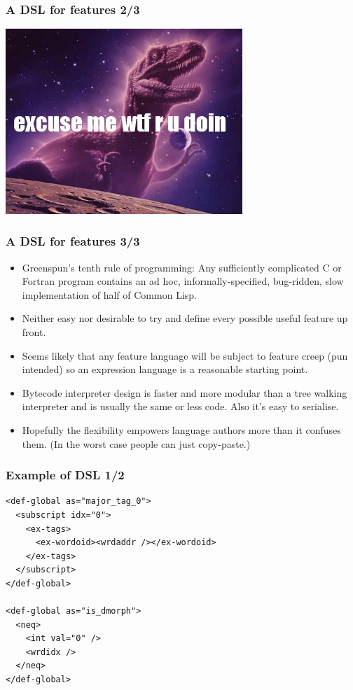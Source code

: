 \documentclass{beamer}
\begin{document}
\begin{frame}
\frametitle{A DSL for features 2/3}
\begin{center}
  \includegraphics[height=7cm]{excuse-me-wtf-are-you-doing.jpg}
\end{center}
\end{frame}

\begin{frame}
\frametitle{A DSL for features 3/3}
\begin{itemize}

  \item Greenspun's tenth rule of programming: Any sufficiently complicated C
    or Fortran program contains an ad hoc, informally-specified, bug-ridden,
    slow implementation of half of Common Lisp.

  \item Neither easy nor desirable to try and define every possible useful
    feature up front.

  \item Seems likely that any feature language will be subject to feature creep
    (pun intended) so an expression language is a reasonable starting point.

  \item Bytecode interpreter design is faster and more modular than a tree
    walking interpreter and is usually the same or less code. Also it's easy to
    serialise.

  \item Hopefully the flexibility empowers language authors more than it
    confuses them. (In the worst case people can just copy-paste.)

\end{itemize}
\end{frame}

\begin{frame}[fragile]
\frametitle{Example of DSL 1/2}
{\scriptsize
\begin{verbatim}
<def-global as="major_tag_0">
  <subscript idx="0">
    <ex-tags>
      <ex-wordoid><wrdaddr /></ex-wordoid>
    </ex-tags>
  </subscript>
</def-global>

<def-global as="is_dmorph">
  <neq>
    <int val="0" />
    <wrdidx />
  </neq>
</def-global>
\end{verbatim}
}

\end{frame}
\end{document}

